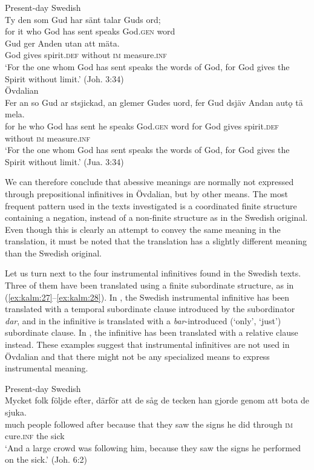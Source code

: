 \documentclass[output=paper]{langscibook}
\begin{document}
\ea
\label{ex:kalm:26}
\ea Present-day Swedish\label{ex:kalm:26a}\\
\gll Ty den som Gud har sänt talar Guds ord;\\
for it who God has sent speaks God.\textsc{gen} word\\ 
\gll Gud ger Anden utan att mäta.\\
God gives spirit.\textsc{def} without \textsc{im} measure.\textsc{inf}\\
‘For the one whom God has sent speaks the words of God, for God gives the Spirit without limit.’ (Joh. 3:34)\\

\ex Övdalian\label{ex:kalm:26b}\\
\gll Fer an so Gud ar stsjickad, an glemer Gudes uord, fer Gud dsjäv Andan autǫ tä mela.\\
for he who God has sent he speaks God.\textsc{gen} word for God gives spirit.\textsc{def} without \textsc{im} measure.\textsc{inf}\\
\glt ‘For the one whom God has sent speaks the words of God, for God gives the Spirit without limit.’ (Jua. 3:34)
\z
\z 


We can therefore conclude that abessive meanings are normally not expressed through prepositional infinitives in Övdalian, but by other means. The most frequent pattern used in the texts investigated is a coordinated finite structure containing a negation, instead of a non-finite structure as in the Swedish original. Even though this is clearly an attempt to convey the same meaning in the translation, it must be noted that the translation has a slightly different meaning than the Swedish original. 



Let us turn next to the four instrumental infinitives found in the Swedish texts. Three of them have been translated using a finite subordinate structure, as in (\ref{ex:kalm:27}–\ref{ex:kalm:28}). In , the Swedish instrumental infinitive has been translated with a temporal subordinate clause introduced by the subordinator \textit{dar}, and in  the infinitive is translated with a \textit{bar}-introduced (‘only’, ‘just’) subordinate clause. In , the infinitive has been translated with a relative clause instead. These examples suggest that instrumental infinitives are not used in Övdalian and that there might not be any specialized means to express instrumental meaning. 


\ea
\label{ex:kalm:27}
\ea Present-day Swedish\label{ex:kalm:27a}\\
\gll Mycket folk följde efter, därför att de såg de tecken han gjorde genom att bota de sjuka.\\
 much people followed after because that they saw the signs he did through \textsc{im} cure.\textsc{inf} the sick\\
\glt ‘And a large crowd was following him, because they saw the signs he performed on the sick.’ (Joh. 6:2)\\
\end{document}
